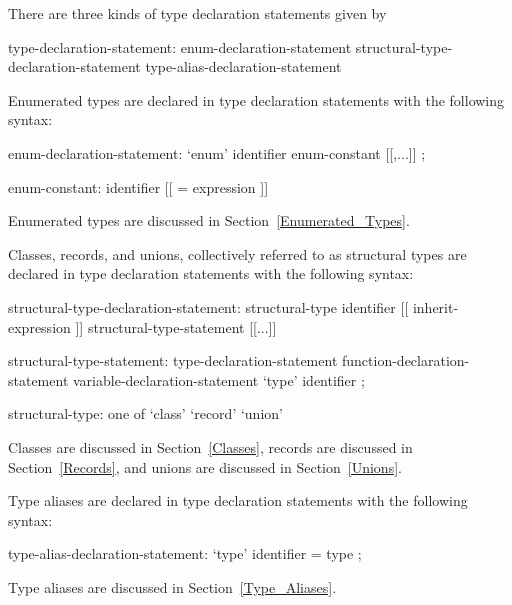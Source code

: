 There are three kinds of type declaration statements given by
\begin{syntax}
type-declaration-statement:
  enum-declaration-statement
  structural-type-declaration-statement
  type-alias-declaration-statement
\end{syntax}

Enumerated types are declared in type declaration statements with the
following syntax:
\begin{syntax}
enum-declaration-statement:
  `enum' identifier { enum-constant [[,...]] } ;

enum-constant:
  identifier [[ = expression ]]
\end{syntax}
Enumerated types are discussed in Section~\ref{Enumerated_Types}.

Classes, records, and unions, collectively referred to as structural
types are declared in type declaration statements with the following
syntax:
\begin{syntax}
structural-type-declaration-statement:
  structural-type identifier [[ inherit-expression ]] {
    structural-type-statement [[...]] }

structural-type-statement:
  type-declaration-statement
  function-declaration-statement
  variable-declaration-statement
  `type' identifier ;

structural-type: one of
  `class' `record' `union'
\end{syntax}
Classes are discussed in Section~\ref{Classes}, records are discussed
in Section~\ref{Records}, and unions are discussed in
Section~\ref{Unions}.

Type aliases are declared in type declaration statements with the
following syntax:
\begin{syntax}
type-alias-declaration-statement:
  `type' identifier = type ;
\end{syntax}
Type aliases are discussed in Section~\ref{Type_Aliases}.
